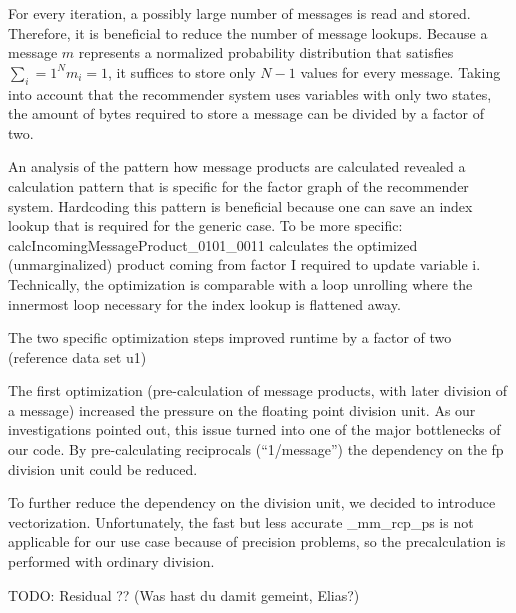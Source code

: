 For every iteration, a possibly large number of messages is read and stored. Therefore, it is beneficial to reduce the number of message lookups. Because a message $m$ represents a normalized probability distribution that satisfies $\sum_i=1^N m_i = 1$, it suffices to store only $N-1$ values for every message. Taking into account that the recommender system uses variables with only two states, the amount of bytes required to store a message can be divided by a factor of two. 

An analysis of the pattern how message products are calculated revealed a calculation pattern that is specific for the factor graph of the recommender system. Hardcoding this pattern is beneficial because one can save an index lookup that is required for the generic case. To be more specific: calcIncomingMessageProduct\_0101\_0011 calculates the optimized (unmarginalized) product coming from factor I required to update variable i. 
Technically, the optimization is comparable with a loop unrolling where the innermost loop necessary for the index lookup is flattened away.

The two specific optimization steps improved runtime by a factor of two (reference data set u1)

The first optimization (pre-calculation of message products, with later division of a message) increased the pressure on the floating point division unit. As our investigations pointed out, this issue turned into one of the major bottlenecks of our code. By pre-calculating reciprocals (“1/message”) the dependency on the fp division unit could be reduced. 

To further reduce the dependency on the division unit, we decided to introduce vectorization.
Unfortunately, the fast but less accurate \_mm\_rcp\_ps is not applicable for our use case because of precision problems, so the precalculation is performed with ordinary division.


TODO: Residual ?? (Was hast du damit gemeint, Elias?)



